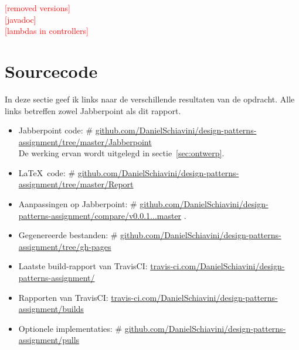 \documentclass[a4paper]{article}
\makeatletter
\newcommand{\todo}[1]{\textcolor{red}{[#1]}\\}
\newcommand*{\repo}{\begingroup\@makeother\#\@repo}
\newcommand*{\@repo}[2]{%
  \href{https://github.com/DanielSchiavini/design-patterns-assignment/#1}{#2}%
  \endgroup}
\newcommand{\repolink}[1]{\repo{#1}{github.com\-/Daniel\-Schiavini\-/de\-sign-\-pat\-terns-\-as\-sign\-ment\-/#1}}
\newcommand{\cilink}[1]{\href{https://travis-ci.com/DanielSchiavini/design-patterns-assignment/#1}{travis-ci.com/DanielSchiavini/design-patterns-assignment/#1}}
\makeatother
\begin{document}
    \todo{removed versions}
    \todo{javadoc}
    \todo{lambdas in controllers}
    
\section{Sourcecode}
In deze sectie geef ik links naar de verschillende resultaten van de opdracht.
Alle links betreffen zowel Jabberpoint als dit rapport.
\begin{itemize}
    \item Jabberpoint code:
        \repolink{tree/master/Jabberpoint}\\
        De werking ervan wordt uitgelegd in sectie~\ref{sec:ontwerp}.
    \item \LaTeX ~code:
        \repo{tree/master/Report}{github.com/DanielSchiavini/design-patterns-assignment/tree\-/master\-/Report}
    \item Aanpassingen op Jabberpoint:
        \repolink{compare/v0.0.1...master}.
    \item Gegenereerde bestanden:
        \repolink{tree/gh-pages}
    \item Laatste build-rapport van TravisCI:
        \cilink{}
    \item Rapporten van TravisCI:
        \cilink{builds}
    \item Optionele implementaties:
        \repolink{pulls}
\end{itemize}
\end{document}
